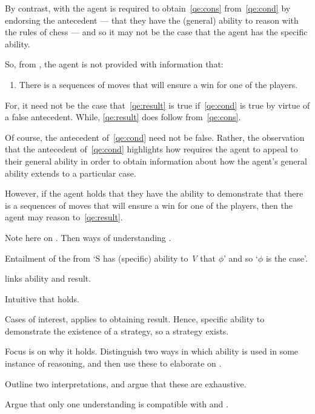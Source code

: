 \begin{note}
  By contrast, with \GSI{} the agent is required to obtain~\ref{qe:cons} from~\ref{qe:cond} by endorsing the antecedent --- that they have the (general) ability to reason with the rules of chess --- and so it may not be the case that the agent has the specific ability.

  So, from \GSI{}, the agent is not provided with information that:
  \begin{enumerate}[label=(I\arabic*), ref=(I\arabic*), resume]
  \item\label{qe:result} There is a sequences of moves that will ensure a win for one of the players.
  \end{enumerate}
  For, it need not be the case that~\ref{qe:result} is true if~\ref{qe:cond} is true by virtue of a false antecedent.
  While, \ref{qe:result} does follow from~\ref{qe:cons}.

  Of course, the antecedent of~\ref{qe:cond} need not be false.
  Rather, the observation that the antecedent of~\ref{qe:cond} highlights how \GSI{} requires the agent to appeal to their general ability in order to obtain information about how the agent's general ability extends to a particular case.

  However, if the agent holds that they have the ability to demonstrate that there is a sequences of moves that will ensure a win for one of the players, then the agent may reason to~\ref{qe:result}.
\end{note}

\begin{note}[\aben{}]
  Note here on \aben{}.
  Then  ways of understanding \aben{}.

  \begin{proposition}
    Entailment of the from `S has (specific) ability to \emph{V} that \(\phi\)' and so `\(\phi\) is the case'.
  \end{proposition}

  \aben{} links ability and result.

  Intuitive that \aben{} holds.

  Cases of interest, \aben{} applies to obtaining result.
  Hence, specific ability to demonstrate the existence of a strategy, so a strategy exists.

  Focus is on why it holds.
  Distinguish two ways in which ability is used in some instance of reasoning, and then use these to elaborate on \aben{}.

  Outline two interpretations, and argue that these are exhaustive.

  Argue that only one understanding is compatible with \GSI{} and \aben{}.
\end{note}

